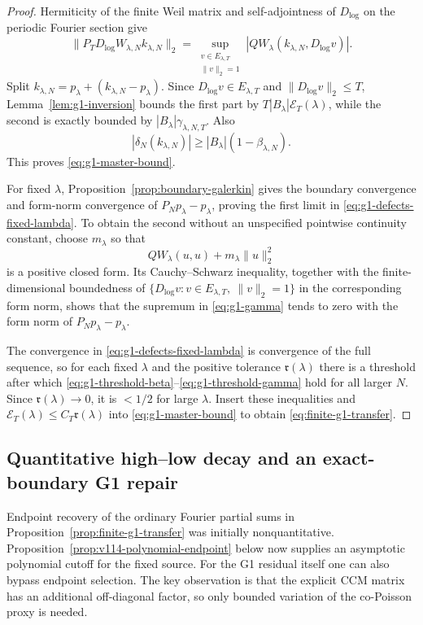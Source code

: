 \documentclass[11pt]{article}
\theoremstyle{remark}
\begin{document}
\begin{proof}
Hermiticity of the finite Weil matrix and self-adjointness of $D_{\log}$ on the
periodic Fourier section give
\[
 \|P_TD_{\log}W_{\lambda,N}k_{\lambda,N}\|_2
 =\sup_{\substack{v\in E_{\lambda,T}\\\|v\|_2=1}}
 |QW_\lambda(k_{\lambda,N},D_{\log}v)|.
\]
Split $k_{\lambda,N}=p_\lambda+(k_{\lambda,N}-p_\lambda)$.  Since
$D_{\log}v\in E_{\lambda,T}$ and
$\|D_{\log}v\|_2\le T$, Lemma~\ref{lem:g1-inversion} bounds the first part by
$T|B_\lambda|\mathcal E_T(\lambda)$, while the second is exactly bounded by
$|B_\lambda|\gamma_{\lambda,N,T}$.  Also
\[
 |\delta_N(k_{\lambda,N})|
 \ge |B_\lambda|(1-\beta_{\lambda,N}).
\]
This proves \eqref{eq:g1-master-bound}.

For fixed $\lambda$, Proposition~\ref{prop:boundary-galerkin} gives the boundary
convergence and form-norm convergence of $P_Np_\lambda-p_\lambda$, proving the
first limit in \eqref{eq:g1-defects-fixed-lambda}.  To obtain the second without
an unspecified pointwise continuity constant, choose $m_\lambda$ so that
\[
 QW_\lambda(u,u)+m_\lambda\|u\|_2^2
\]
is a positive closed form.  Its Cauchy--Schwarz inequality, together with the
finite-dimensional boundedness of
$\{D_{\log}v:v\in E_{\lambda,T},\ \|v\|_2=1\}$ in the corresponding form norm,
shows that the supremum in \eqref{eq:g1-gamma} tends to zero with the form norm
of $P_Np_\lambda-p_\lambda$.

The convergence in \eqref{eq:g1-defects-fixed-lambda} is convergence of the
full sequence, so for each fixed $\lambda$ and the positive tolerance
$\mathfrak r(\lambda)$ there is a threshold after which
\eqref{eq:g1-threshold-beta}--\eqref{eq:g1-threshold-gamma} hold for all larger
$N$.  Since $\mathfrak r(\lambda)\to0$, it is $<1/2$ for large $\lambda$.
Insert these inequalities and
$\mathcal E_T(\lambda)\le C_T\mathfrak r(\lambda)$ into
\eqref{eq:g1-master-bound} to obtain \eqref{eq:finite-g1-transfer}.
\end{proof}


\subsection*{Quantitative high--low decay and an exact-boundary G1 repair}
Endpoint recovery of the ordinary Fourier partial sums in
Proposition~\ref{prop:finite-g1-transfer} was initially nonquantitative.
Proposition~\ref{prop:v114-polynomial-endpoint} below now supplies an
asymptotic polynomial cutoff for the fixed source. For the G1
residual itself one can also bypass endpoint selection.  The key observation is that the
explicit CCM matrix has an additional off-diagonal factor, so only bounded
variation of the co-Poisson proxy is needed.
\end{document}
